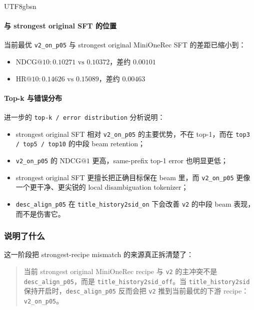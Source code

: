 \documentclass[11pt]{article}
\begin{document}
\begin{CJK*}{UTF8}{gbsn}
\paragraph{与 strongest original SFT 的位置}

当前最优 \texttt{v2\_on\_p05} 与 strongest original MiniOneRec SFT 的差距已缩小到：

\begin{itemize}
  \item \(\mathrm{NDCG}@10: 0.10271 \text{ vs } 0.10372\)，差约 \(0.00101\)
  \item \(\mathrm{HR}@10: 0.14626 \text{ vs } 0.15089\)，差约 \(0.00463\)
\end{itemize}

\paragraph{Top-k 与错误分布}

进一步的 \texttt{top-k / error distribution} 分析说明：

\begin{itemize}
  \item strongest original SFT 相对 \texttt{v2\_on\_p05} 的主要优势，不在 top-1，而在 \texttt{top3 / top5 / top10} 的中段 beam retention；
  \item \texttt{v2\_on\_p05} 的 \(\mathrm{NDCG}@1\) 更高，same-prefix top-1 error 也明显更低；
  \item strongest original SFT 更擅长把正确目标保在 beam 里，而 \texttt{v2\_on\_p05} 更像一个更干净、更尖锐的 local disambiguation tokenizer；
  \item \texttt{desc\_align\_p05} 在 \texttt{title\_history2sid\_on} 下会改善 \texttt{v2} 的中段 beam 表现，而不是伤害它。
\end{itemize}

\subsubsection*{说明了什么}

这一阶段把 strongest-recipe mismatch 的来源真正拆清楚了：

\begin{quote}
当前 strongest original MiniOneRec recipe 与 \texttt{v2} 的主冲突不是 \texttt{desc\_align\_p05}，而是 \texttt{title\_history2sid\_off}。当 \texttt{title\_history2sid} 保持开启时，\texttt{desc\_align\_p05} 反而会把 \texttt{v2} 推到当前最优的下游 recipe：\texttt{v2\_on\_p05}。
\end{quote}


\end{CJK*}
\end{document}
